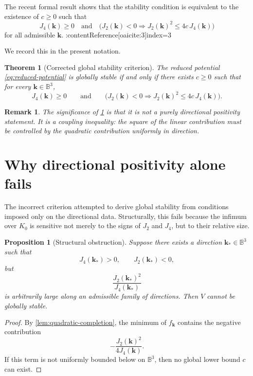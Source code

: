 \documentclass[11pt,a4paper]{article}
\newtheorem{theorem}[definition]{Theorem}
\newtheorem{proposition}[definition]{Proposition}
\newtheorem{remark}[definition]{Remark}
\newcommand{\kk}{\bm{k}}
\newcommand{\Sphere}{\mathbb{B}^3}
\begin{document}
	The recent formal result shows that the stability condition is equivalent to the existence of \(c\ge 0\) such that
	\[
	J_4(\kk)\ge 0
	\quad\text{and}\quad
	\bigl(J_2(\kk)<0 \Longrightarrow J_2(\kk)^2\le 4c\,J_4(\kk)\bigr)
	\]
	for all admissible \(\kk\). :contentReference[oaicite:3]{index=3}
	
	We record this in the present notation.
	
	\begin{theorem}[Corrected global stability criterion]\label{thm:corrected-criterion}
		The reduced potential \eqref{eq:reduced-potential} is globally stable if and only if there exists \(c\ge 0\) such that for every \(\kk\in\Sphere\),
		\begin{equation}\label{eq:corrected-criterion}
			J_4(\kk)\ge 0
			\qquad\text{and}\qquad
			\bigl(J_2(\kk)<0 \Longrightarrow J_2(\kk)^2\le 4c\,J_4(\kk)\bigr).
		\end{equation}
	\end{theorem}
	
	\begin{remark}
		The significance of \cref{thm:corrected-criterion} is that it is not a purely directional positivity statement. It is a \emph{coupling inequality}: the square of the linear contribution must be controlled by the quadratic contribution uniformly in direction.
	\end{remark}
	
	\section{Why directional positivity alone fails}
	
	The incorrect criterion attempted to derive global stability from conditions imposed only on the directional data. Structurally, this fails because the infimum over \(K_0\) is sensitive not merely to the signs of \(J_2\) and \(J_4\), but to their relative size.
	
	\begin{proposition}[Structural obstruction]\label{prop:obstruction}
		Suppose there exists a direction \(\kk_*\in\Sphere\) such that
		\[
		J_4(\kk_*)>0,\qquad J_2(\kk_*)<0,
		\]
		but
		\[
		\frac{J_2(\kk_*)^2}{J_4(\kk_*)}
		\]
		is arbitrarily large along an admissible family of directions. Then \(V\) cannot be globally stable.
	\end{proposition}
	
	\begin{proof}
		By \cref{lem:quadratic-completion}, the minimum of \(f_{\kk}\) contains the negative contribution
		\[
		-\frac{J_2(\kk)^2}{4J_4(\kk)}.
		\]
		If this term is not uniformly bounded below on \(\Sphere\), then no global lower bound \(c\) can exist.
	\end{proof}
	
\end{document}
